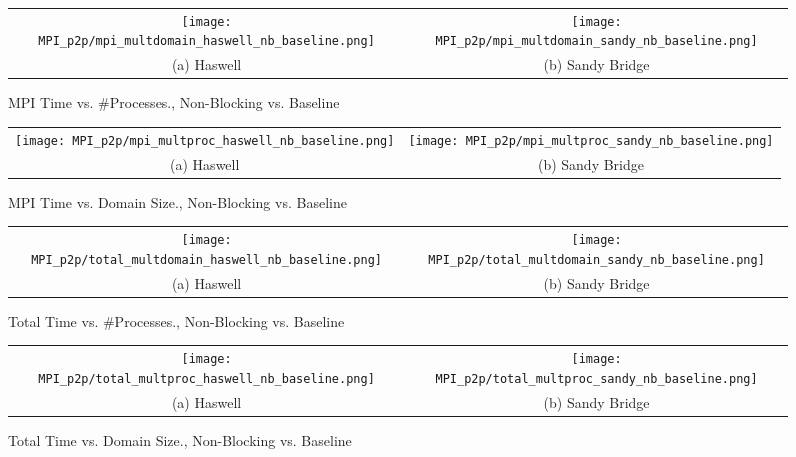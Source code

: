 \begin{enumerate}
		\begin{figure}[h] %
		\hspace*{-0.25\linewidth}\begin{tabular}{cc}
			\texttt{[image: MPI\_p2p/mpi\_multdomain\_haswell\_nb\_baseline.png]} & \texttt{[image: MPI\_p2p/mpi\_multdomain\_sandy\_nb\_baseline.png]} \\
			(a) Haswell &  (b) Sandy Bridge\\[6pt]
		\end{tabular}
		\caption{MPI Time vs. \#Processes., Non-Blocking vs. Baseline}
		\label{fig:mpi_multdomain_nb_baseline}
	\end{figure}
	
		\begin{figure}[h] %
		\hspace*{-0.25\linewidth}\begin{tabular}{cc}
			\texttt{[image: MPI\_p2p/mpi\_multproc\_haswell\_nb\_baseline.png]} & \texttt{[image: MPI\_p2p/mpi\_multproc\_sandy\_nb\_baseline.png]} \\
			(a) Haswell &  (b) Sandy Bridge\\[6pt]
		\end{tabular}
		\caption{MPI Time vs. Domain Size., Non-Blocking vs. Baseline}
		\label{fig:mpi_multproc_nb_baseline}
	\end{figure}
	
			\begin{figure}[h] %
		\hspace*{-0.25\linewidth}\begin{tabular}{cc}
			\texttt{[image: MPI\_p2p/total\_multdomain\_haswell\_nb\_baseline.png]} & \texttt{[image: MPI\_p2p/total\_multdomain\_sandy\_nb\_baseline.png]} \\
			(a) Haswell &  (b) Sandy Bridge\\[6pt]
		\end{tabular}
		\caption{Total Time vs. \#Processes., Non-Blocking vs. Baseline}
		\label{fig:total_multdomain_nb_baseline}
	\end{figure}
	
		\begin{figure}[h] %
		\hspace*{-0.25\linewidth}\begin{tabular}{cc}
			\texttt{[image: MPI\_p2p/total\_multproc\_haswell\_nb\_baseline.png]} & \texttt{[image: MPI\_p2p/total\_multproc\_sandy\_nb\_baseline.png]} \\
			(a) Haswell &  (b) Sandy Bridge\\[6pt]
		\end{tabular}
		\caption{Total Time vs. Domain Size., Non-Blocking vs. Baseline}
		\label{fig:total_multproc_nb_baseline}
	\end{figure}

\end{enumerate}

